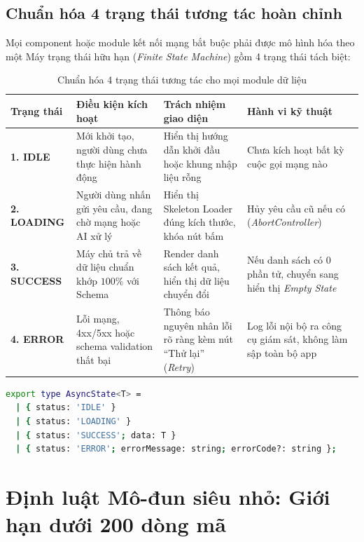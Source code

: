 \documentclass[a4paper,11pt]{article}
\begin{document}
\subsection{Chuẩn hóa 4 trạng thái tương tác hoàn chỉnh}
Mọi component hoặc module kết nối mạng bắt buộc phải được mô hình hóa theo một Máy trạng thái hữu hạn (\textit{Finite State Machine}) gồm 4 trạng thái tách biệt:

\begin{table}[htbp]
\centering
\small
\caption{Chuẩn hóa 4 trạng thái tương tác cho mọi module dữ liệu}
\vspace{0.5em}
\begin{tabularx}{\textwidth}{L{2.5cm} L{4.5cm} L{4.5cm} Y}
\toprule
\textbf{Trạng thái} & \textbf{Điều kiện kích hoạt} & \textbf{Trách nhiệm giao diện} & \textbf{Hành vi kỹ thuật} \\
\midrule
\textbf{1. IDLE} & Mới khởi tạo, người dùng chưa thực hiện hành động & Hiển thị hướng dẫn khởi đầu hoặc khung nhập liệu rỗng & Chưa kích hoạt bất kỳ cuộc gọi mạng nào \\
\textbf{2. LOADING} & Người dùng nhấn gửi yêu cầu, đang chờ mạng hoặc AI xử lý & Hiển thị Skeleton Loader đúng kích thước, khóa nút bấm & Hủy yêu cầu cũ nếu có (\textit{AbortController}) \\
\textbf{3. SUCCESS} & Máy chủ trả về dữ liệu chuẩn khớp $100\%$ với Schema & Render danh sách kết quả, hiển thị dữ liệu chuyển đổi & Nếu danh sách có 0 phần tử, chuyển sang hiển thị \textit{Empty State} \\
\textbf{4. ERROR} & Lỗi mạng, 4xx/5xx hoặc schema validation thất bại & Thông báo nguyên nhân lỗi rõ ràng kèm nút ``Thử lại'' (\textit{Retry}) & Log lỗi nội bộ ra công cụ giám sát, không làm sập toàn bộ app \\
\bottomrule
\end{tabularx}
\end{table}

\begin{lstlisting}[language=bash, caption={Dac ta kieu du lieu cho May trang thai 4 buoc}]
export type AsyncState<T> =
  | { status: 'IDLE' }
  | { status: 'LOADING' }
  | { status: 'SUCCESS'; data: T }
  | { status: 'ERROR'; errorMessage: string; errorCode?: string };
\end{lstlisting}

\section{Định luật Mô-đun siêu nhỏ: Giới hạn dưới 200 dòng mã}
\end{document}
